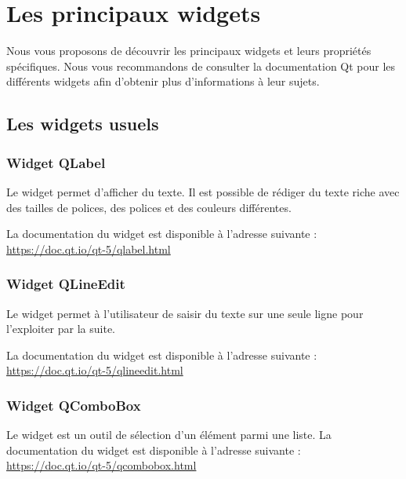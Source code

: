 \chapter{Les principaux widgets}

Nous vous proposons de découvrir les principaux widgets et leurs propriétés spécifiques.
\newline
Nous vous recommandons de consulter la documentation Qt pour les différents widgets afin d'obtenir plus d'informations à leur sujets.

\section{Les widgets usuels}
\subsection{Widget QLabel}

Le widget  permet d'afficher du texte. 
Il est possible de rédiger du texte riche avec des tailles de polices, des polices et des couleurs différentes. \newline \newline


La documentation du widget est disponible à l'adresse suivante : \newline  \url{https://doc.qt.io/qt-5/qlabel.html}


\subsection{Widget QLineEdit}

Le widget  permet à l'utilisateur de saisir du texte sur une seule ligne pour l'exploiter par la suite. 


La documentation du widget est disponible à l'adresse suivante : \newline  \url{https://doc.qt.io/qt-5/qlineedit.html}


\subsection{Widget QComboBox}

Le widget  est un outil de sélection d'un élément parmi une liste. \newline \newline
La documentation du widget est disponible à l'adresse suivante : \\  \url{https://doc.qt.io/qt-5/qcombobox.html} 

